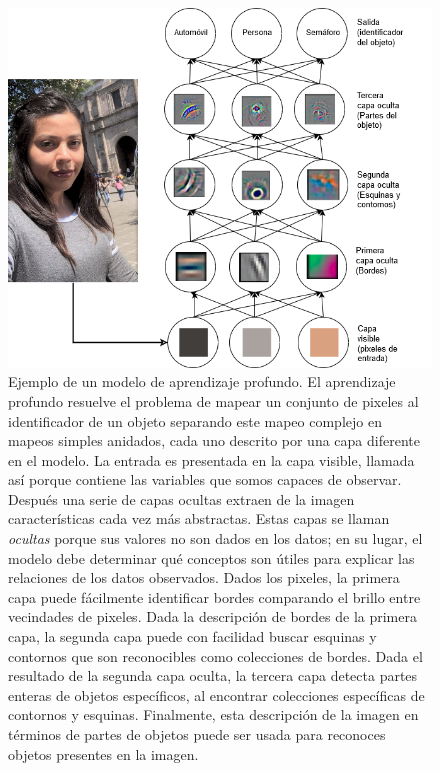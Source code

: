 \begin{figure}
    \centering
    \includegraphics[scale=0.5]{figures/deep_learning_person.png}
    \caption{Ejemplo de un modelo de aprendizaje profundo. El aprendizaje profundo resuelve el problema de mapear un conjunto de pixeles al identificador de un objeto separando este mapeo
    complejo en mapeos simples anidados, cada uno descrito por
    una capa diferente en el modelo. La entrada es presentada
    en la capa visible, llamada así porque contiene las variables que somos capaces de observar. Después una serie de capas ocultas extraen de la imagen características cada vez más
    abstractas. Estas capas se llaman \textit{ocultas} porque
    sus valores no son dados en los datos; en su lugar, el modelo
    debe determinar qué conceptos son útiles para explicar 
    las relaciones de los datos observados. Dados los pixeles,
    la primera capa puede fácilmente identificar bordes comparando
    el brillo entre vecindades de pixeles.
    Dada la descripción de bordes de la primera capa, la segunda
    capa puede con facilidad buscar esquinas y contornos
    que son reconocibles como colecciones de bordes. Dada el 
    resultado de la segunda capa oculta, la tercera capa detecta
    partes enteras de objetos específicos, al encontrar
    colecciones específicas de contornos y esquinas. 
    Finalmente, esta descripción de la imagen en términos 
    de partes de objetos puede ser usada para reconoces objetos
    presentes en la imagen.\label{fig:deeplearning_person}}
    
\end{figure}
